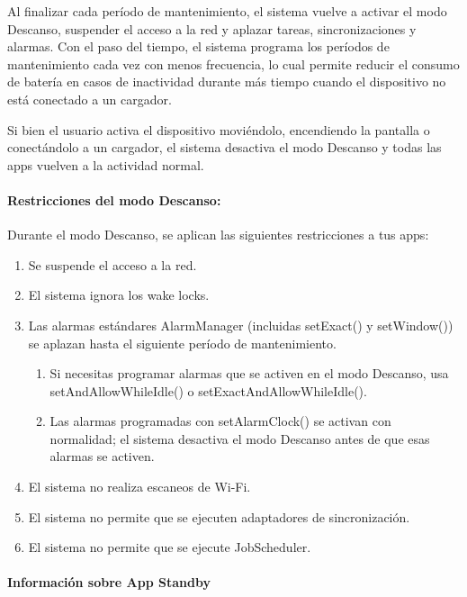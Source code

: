 Al finalizar cada período de mantenimiento, el sistema vuelve a activar 
el modo Descanso, suspender el acceso a la red y aplazar tareas, 
sincronizaciones y alarmas. Con el paso del tiempo, el sistema programa
 los períodos de mantenimiento cada vez con menos frecuencia, lo cual
 permite reducir el consumo de batería en casos de inactividad durante 
más tiempo cuando el dispositivo no está conectado a un cargador.

Si bien el usuario activa el dispositivo moviéndolo, encendiendo la pantalla
 o conectándolo a un cargador, el sistema desactiva el modo Descanso 
y todas las apps vuelven a la actividad normal.

\paragraph{Restricciones del modo Descanso:}
Durante el modo Descanso, se aplican las siguientes restricciones a tus apps:
\begin{enumerate}
\item Se suspende el acceso a la red.
\item El sistema ignora los wake locks.
\item Las alarmas estándares AlarmManager (incluidas setExact() y setWindow())
 se aplazan hasta el siguiente período de mantenimiento.
\begin{enumerate}
\item Si necesitas programar alarmas que se activen en el modo Descanso, 
usa setAndAllowWhileIdle() o setExactAndAllowWhileIdle().
\item Las alarmas programadas con setAlarmClock() se activan con normalidad;
 el sistema desactiva el modo Descanso antes de que esas alarmas se activen.
\end{enumerate}
\item El sistema no realiza escaneos de Wi-Fi.
\item El sistema no permite que se ejecuten adaptadores de sincronización.
\item El sistema no permite que se ejecute JobScheduler.
\end{enumerate}

\paragraph{Información sobre App Standby}

